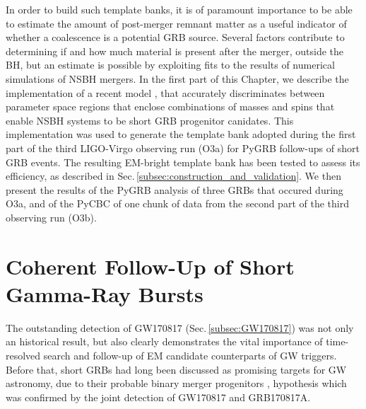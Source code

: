 \documentclass[binding=0.6cm, LaM]{sapthesis}
\begin{document}
	In order to build such template banks,
        it is of paramount importance to be able to estimate the amount of post-merger remnant matter as a useful indicator of 
	whether a coalescence is a potential GRB source.
	Several factors contribute to determining if and how much material is present after the merger, outside the BH,
        but an estimate is possible by exploiting fits to the results of
        numerical simulations of NSBH mergers.
	In the first part of this Chapter, we describe the implementation of a recent model \cite{205}, that accurately discriminates between parameter space 
	regions that enclose combinations of masses and spins that enable NSBH systems to be short GRB progenitor canidates.
        This implementation was used to generate the template bank adopted during the first part of the third LIGO-Virgo observing run (O3a) for {\ttfamily PyGRB} follow-ups of short GRB events.
	The resulting EM-bright template bank has been tested to assess its efficiency, as described in Sec.\,\ref{subsec:construction_and_validation}.
	We then present the results of the {\ttfamily PyGRB} analysis of three GRBs that occured during O3a, and 
	of the {\ttfamily PyCBC} of one chunk of data from the second part of the third observing run (O3b).

\section{Coherent Follow-Up of Short Gamma-Ray Bursts}
\label{sec:grbfollowup}
	The outstanding detection of GW170817 (Sec.\,\ref{subsec:GW170817}) was not only an historical result,
        but also clearly demonstrates the vital importance of time-resolved search and follow-up of EM candidate counterparts of GW triggers.
        Before that, short GRBs had long been discussed as promising targets for GW astronomy,
        due to their probable binary merger progenitors \cite{162},
        hypothesis which was confirmed by the joint detection of GW170817  and GRB170817A.	
\end{document}
